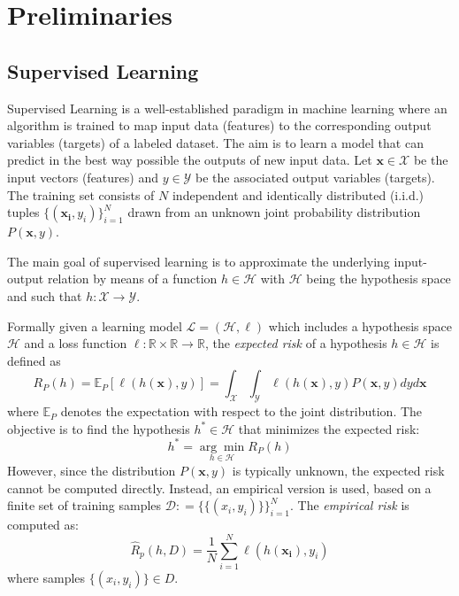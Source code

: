 \chapter{Preliminaries}\label{ch:preliminaries}

\section{Supervised Learning}\label{sec:supervised_leaning}
Supervised Learning is a well-established paradigm in machine learning where an
algorithm is trained to map input data (features) to the corresponding output
variables (targets) of a labeled dataset. The aim is to learn a model that can
predict in the best way possible the outputs of new input data. Let $\mathbf{x}
    \in \mathcal{X}$ be the input vectors (features) and $ y \in \mathcal{Y}$ be
the associated output variables (targets). The training set consists of $N$
independent and identically distributed (i.i.d.) tuples $\{(\mathbf{x_i},
    y_i)\}^N_{i=1}$ drawn from an unknown joint probability distribution
$P(\mathbf{x},y)$.

The main goal of supervised learning is to approximate the underlying
input-output relation by means of a function $h \in \mathcal{H}$ with
$\mathcal{H}$ being the hypothesis space and such that $h: \mathcal{X}
    \rightarrow \mathcal{Y}$.

Formally given a learning model $\mathcal{L} = (\mathcal{H},\ell)$ which
includes a hypothesis space $\mathcal{H}$ and a loss function $\ell: \mathbb{R}
    \times \mathbb{R} \rightarrow \mathbb{R}$, the \textit{expected risk} of a
hypothesis $h \in \mathcal{H}$ is defined as
\begin{equation}
    R_P(h) = \mathbb{E}_P[\ell(h(\mathbf{x}),y)] = \int_{\mathcal{X}} \int_{\mathcal{Y}}
    \ell(h(\mathbf{x}),y)P(\mathbf{x},y)dyd\mathbf{x}
\end{equation}
where $\mathbb{E}_P$ denotes the expectation with respect to the joint distribution.
The objective is to find the hypothesis $h^* \in \mathcal{H}$ that minimizes
the expected risk:
\begin{equation}
    h^* = \underset{h \in \mathcal{H}}{\arg\min} R_P(h)
\end{equation}
However, since the distribution $P(\mathbf{x},y)$ is typically unknown, the
expected risk cannot be computed directly. Instead, an empirical version is
used, based on a finite set of training samples $\mathcal{D}: = \{ \{ (x_i, y_i) \} \}_{i=1}^N$.
The \textit{empirical risk} is computed as:
\begin{equation}
    \hat{R}_p(h, D) = {\frac{1}{N}} \sum^N_{i=1} \ell(h(\mathbf{x_i}),y_i)
\end{equation}
where samples $\{ (x_i, y_i) \} \in D$.

